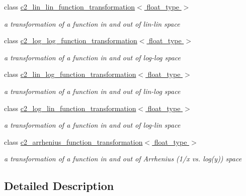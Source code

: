 \begin{DoxyCompactItemize}
class \hyperlink{classc2__lin__lin__function__transformation}{c2\+\_\+lin\+\_\+lin\+\_\+function\+\_\+transformation$<$ float\+\_\+type $>$}
\begin{DoxyCompactList}\small\item\em a transformation of a function in and out of lin-\/lin space \end{DoxyCompactList}\item 
class \hyperlink{classc2__log__log__function__transformation}{c2\+\_\+log\+\_\+log\+\_\+function\+\_\+transformation$<$ float\+\_\+type $>$}
\begin{DoxyCompactList}\small\item\em a transformation of a function in and out of log-\/log space \end{DoxyCompactList}\item 
class \hyperlink{classc2__lin__log__function__transformation}{c2\+\_\+lin\+\_\+log\+\_\+function\+\_\+transformation$<$ float\+\_\+type $>$}
\begin{DoxyCompactList}\small\item\em a transformation of a function in and out of lin-\/log space \end{DoxyCompactList}\item 
class \hyperlink{classc2__log__lin__function__transformation}{c2\+\_\+log\+\_\+lin\+\_\+function\+\_\+transformation$<$ float\+\_\+type $>$}
\begin{DoxyCompactList}\small\item\em a transformation of a function in and out of log-\/lin space \end{DoxyCompactList}\item 
class \hyperlink{classc2__arrhenius__function__transformation}{c2\+\_\+arrhenius\+\_\+function\+\_\+transformation$<$ float\+\_\+type $>$}
\begin{DoxyCompactList}\small\item\em a transformation of a function in and out of Arrhenius (1/x vs. log(y)) space \end{DoxyCompactList}\end{DoxyCompactItemize}


\subsection{Detailed Description}
